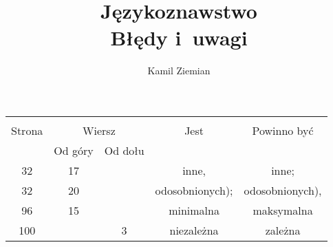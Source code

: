 \documentclass[a4paper,11pt]{article}
\title{Językoznawstwo \\
  Błędy i~uwagi}
\author{Kamil Ziemian}
\begin{document}





\maketitle %









\begin{center}

  \begin{tabular}{|c|c|c|c|c|}
    \hline
    & \multicolumn{2}{c|}{} & & \\
    Strona & \multicolumn{2}{c|}{Wiersz} & Jest
                              & Powinno być \\ \cline{2-3}
    & Od góry & Od dołu & & \\
    \hline
    32  & 17 & & inne, & inne; \\
    32  & 20 & & odosobnionych); & odosobnionych), \\
    96  & 15 & & minimalna & maksymalna \\
    100 & &  3 & niezależna & zależna \\
    \hline
  \end{tabular}

\end{center}

\vspace{\spaceOne}





\end{document}
